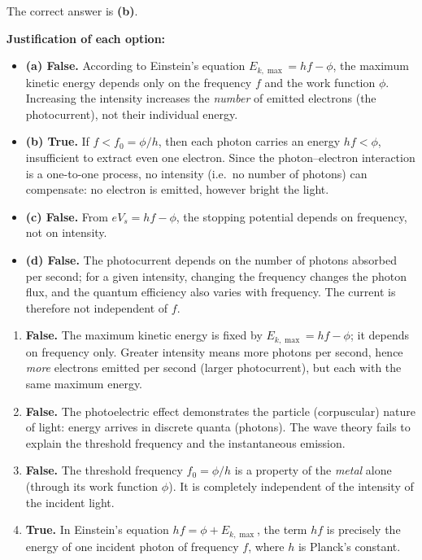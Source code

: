 \documentclass[11pt]{article}
\newcommand{\cle}[1]{{\popxbold\color{popdark}#1}}
\begin{document}
\begin{corrige}
The correct answer is \textbf{(b)}.

\textbf{Justification of each option:}
\begin{itemize}
\item \textbf{(a) False.} According to Einstein's equation $E_{k,\max} = hf - \phi$, the maximum kinetic energy depends only on the \cle{frequency} $f$ and the work function $\phi$. Increasing the intensity increases the \emph{number} of emitted electrons (the photocurrent), not their individual energy.
\item \textbf{(b) True.} If $f < f_0 = \phi/h$, then each photon carries an energy $hf < \phi$, insufficient to extract even one electron. Since the photon–electron interaction is a one-to-one process, no intensity (i.e.\ no number of photons) can compensate: no electron is emitted, however bright the light.
\item \textbf{(c) False.} From $eV_s = hf - \phi$, the stopping potential depends on frequency, not on intensity.
\item \textbf{(d) False.} The photocurrent depends on the number of photons absorbed per second; for a given intensity, changing the frequency changes the photon flux, and the quantum efficiency also varies with frequency. The current is therefore not independent of $f$.
\end{itemize}
\end{corrige}

\begin{corrige}
\begin{enumerate}
\item \textbf{False.} The maximum kinetic energy is fixed by $E_{k,\max} = hf - \phi$; it depends on frequency only. Greater intensity means more photons per second, hence \emph{more} electrons emitted per second (larger photocurrent), but each with the same maximum energy.
\item \textbf{False.} The photoelectric effect demonstrates the \cle{particle (corpuscular) nature} of light: energy arrives in discrete quanta (photons). The wave theory fails to explain the threshold frequency and the instantaneous emission.
\item \textbf{False.} The threshold frequency $f_0 = \phi/h$ is a property of the \emph{metal} alone (through its work function $\phi$). It is completely independent of the intensity of the incident light.
\item \textbf{True.} In Einstein's equation $hf = \phi + E_{k,\max}$, the term $hf$ is precisely the energy of one incident photon of frequency $f$, where $h$ is Planck's constant.
\end{enumerate}
\end{corrige}
\end{document}
